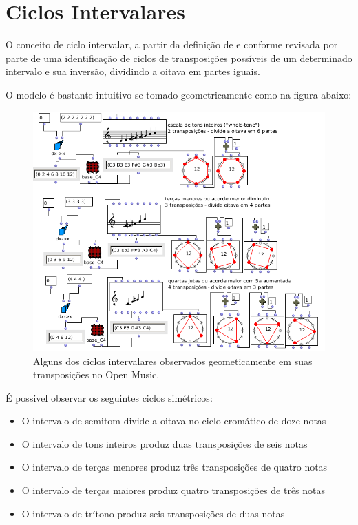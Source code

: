 \documentclass[
	12pt,				%
	openright,			%
	twoside,			%
	a4paper,			%
	english,			%
	french,				%
	spanish,			%
	brazil				%
	]{abntex2}
\begin{document}
\section{Ciclos Intervalares}
\label{ciclos}

O conceito de ciclo intervalar, a partir da definição de  e conforme revisada por  parte de uma identificação de ciclos de transposições possíveis de um determinado intervalo e sua inversão, dividindo a oitava em partes iguais.

O modelo é bastante intuitivo se tomado geometricamente como na figura abaixo:

\begin{figure}[!h]
	\caption{\label{fig_grafico}Alguns dos ciclos intervalares observados geometicamente em suas transposições no Open Music.  }
	\begin{center}
	    \includegraphics[scale=0.5]{ciclos/ciclosOM.png}
	\end{center}
\end{figure}

É possivel observar os seguintes ciclos simétricos:

\begin{itemize}
\item O intervalo de semitom divide a oitava no ciclo cromático de doze notas
\item O intervalo de tons inteiros produz duas transposições de seis notas
\item O intervalo de terças menores produz três transposições de quatro notas
\item O intervalo de terças maiores produz quatro transposições de três notas
\item O intervalo de trítono produz seis transposições de duas notas
\end{itemize}
\end{document}
